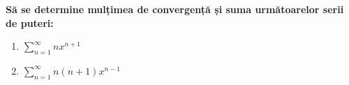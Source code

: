 \documentclass[12pt, a4paper]{report}
\begin{document}
	\bigskip
	\noindent\textbf{Să se determine mulțimea de convergență și suma următoarelor serii de puteri:}
	\vspace{0.2cm}
	
	\begin{enumerate}[label=\textbf{\arabic*.}, resume]
		\item $\displaystyle \sum_{n=1}^{\infty} n x^{n+1}$
		\item $\displaystyle \sum_{n=1}^{\infty} n(n+1) x^{n-1}$
	\end{enumerate}
	
\end{document}
